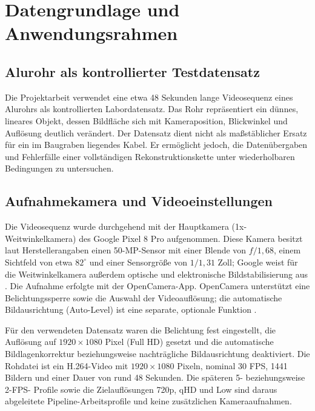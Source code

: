 \section{Datengrundlage und Anwendungsrahmen}
\label{sec:datengrundlage}

\subsection{Alurohr als kontrollierter Testdatensatz}

Die Projektarbeit verwendet eine etwa 48 Sekunden lange Videosequenz eines
Alurohrs als kontrollierten Labordatensatz. Das Rohr repräsentiert ein dünnes,
lineares Objekt, dessen Bildfläche sich mit Kameraposition, Blickwinkel und
Auflösung deutlich verändert. Der Datensatz dient nicht als maßstäblicher
Ersatz für ein im Baugraben liegendes Kabel. Er ermöglicht jedoch, die
Datenübergaben und Fehlerfälle einer vollständigen Rekonstruktionskette unter
wiederholbaren Bedingungen zu untersuchen.

\subsection{Aufnahmekamera und Videoeinstellungen}

Die Videosequenz wurde durchgehend mit der Hauptkamera (1x-Weitwinkelkamera)
des Google Pixel 8 Pro aufgenommen. Diese Kamera besitzt laut
Herstellerangaben einen 50-MP-Sensor mit einer Blende von $f/1{,}68$, einem
Sichtfeld von etwa $82^\circ$ und einer Sensorgröße von $1/1{,}31$ Zoll;
Google weist für die Weitwinkelkamera außerdem optische und elektronische
Bildstabilisierung aus \parencite{googlePixel8ProSpecs}. Die Aufnahme erfolgte
mit der OpenCamera-App. OpenCamera unterstützt eine Belichtungssperre sowie
die Auswahl der Videoauflösung; die automatische Bildausrichtung (Auto-Level)
ist eine separate, optionale Funktion \parencite{openCameraHelp}.

Für den verwendeten Datensatz waren die Belichtung fest eingestellt, die
Auflösung auf $1920\times1080$ Pixel (Full HD) gesetzt und die automatische
Bildlagenkorrektur beziehungsweise nachträgliche Bildausrichtung deaktiviert.
Die Rohdatei  ist ein H.264-Video mit
$1920\times1080$ Pixeln, nominal 30 FPS, 1441 Bildern und einer Dauer von rund
48 Sekunden. Die späteren 5- beziehungsweise 2-FPS-
Profile sowie die Zielauflösungen 720p, qHD und Low sind daraus abgeleitete
Pipeline-Arbeitsprofile und keine zusätzlichen Kameraaufnahmen.

